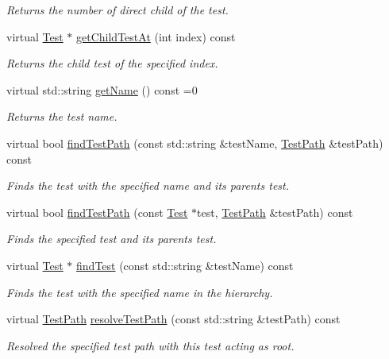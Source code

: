\begin{DoxyCompactItemize}
\begin{DoxyCompactList}\small\item\em Returns the number of direct child of the test. \end{DoxyCompactList}\item 
virtual \hyperlink{class_test}{Test} $\ast$ \hyperlink{class_test_aad295af3b440fdec4bd95ddd422466b8}{get\+Child\+Test\+At} (int index) const 
\begin{DoxyCompactList}\small\item\em Returns the child test of the specified index. \end{DoxyCompactList}\item 
virtual std\+::string \hyperlink{class_test_a5249569313f295a622580ffd99c9d816}{get\+Name} () const  =0
\begin{DoxyCompactList}\small\item\em Returns the test name. \end{DoxyCompactList}\item 
virtual bool \hyperlink{class_test_a609b4d93fde2f4fa5b4177c1e1a002ff}{find\+Test\+Path} (const std\+::string \&test\+Name, \hyperlink{class_test_path}{Test\+Path} \&test\+Path) const 
\begin{DoxyCompactList}\small\item\em Finds the test with the specified name and its parents test. \end{DoxyCompactList}\item 
virtual bool \hyperlink{class_test_a9f0c1e40c1378f596bd5effd3a034652}{find\+Test\+Path} (const \hyperlink{class_test}{Test} $\ast$test, \hyperlink{class_test_path}{Test\+Path} \&test\+Path) const 
\begin{DoxyCompactList}\small\item\em Finds the specified test and its parents test. \end{DoxyCompactList}\item 
virtual \hyperlink{class_test}{Test} $\ast$ \hyperlink{class_test_a4182e55e98622e6daf5460e5c948dc82}{find\+Test} (const std\+::string \&test\+Name) const 
\begin{DoxyCompactList}\small\item\em Finds the test with the specified name in the hierarchy. \end{DoxyCompactList}\item 
virtual \hyperlink{class_test_path}{Test\+Path} \hyperlink{class_test_aaa1f5a8b47a9ad4feed4603c7e56758c}{resolve\+Test\+Path} (const std\+::string \&test\+Path) const 
\begin{DoxyCompactList}\small\item\em Resolved the specified test path with this test acting as \textquotesingle{}root\textquotesingle{}. \end{DoxyCompactList}\end{DoxyCompactItemize}
